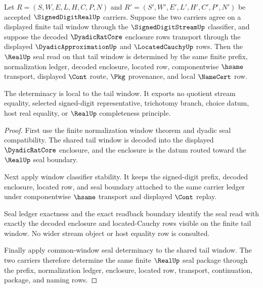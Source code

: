 \begin{theorem}
\label{thm:signed-digit-real-tail-window-seal-determinacy}
Let $R=(S,W,E,L,H,C,P,N)$ and $R'=(S',W',E',L',H',C',P',N')$ be accepted $\SignedDigitRealUp$ carriers. Suppose the two carriers agree on a displayed finite tail window through the $\SignedDigitStreamUp$ classifier, and suppose the decoded $\DyadicRatCore$ enclosure rows transport through the displayed $\DyadicApproximationUp$ and $\LocatedCauchyUp$ rows. Then the $\RealUp$ seal read on that tail window is determined by the same finite prefix, normalization ledger, decoded enclosure, located row, componentwise $\hsame$ transport, displayed $\Cont$ route, $\Pkg$ provenance, and local $\NameCert$ row.

The determinacy is local to the tail window. It exports no quotient stream equality, selected signed-digit representative, trichotomy branch, choice datum, host real equality, or $\RealUp$ completeness principle.
\end{theorem}
\begin{proof}
First use the finite normalization window theorem and dyadic seal compatibility. The shared tail window is decoded into the displayed $\DyadicRatCore$ enclosure, and the enclosure is the datum routed toward the $\RealUp$ seal boundary.

Next apply window classifier stability. It keeps the signed-digit prefix, decoded enclosure, located row, and seal boundary attached to the same carrier ledger under componentwise $\hsame$ transport and displayed $\Cont$ replay.

Seal ledger exactness and the exact readback boundary identify the seal read with exactly the decoded enclosure and located-Cauchy rows visible on the finite tail window. No wider stream object or host equality row is consulted.

Finally apply common-window seal determinacy to the shared tail window. The two carriers therefore determine the same finite $\RealUp$ seal package through the prefix, normalization ledger, enclosure, located row, transport, continuation, package, and naming rows.
\end{proof}


